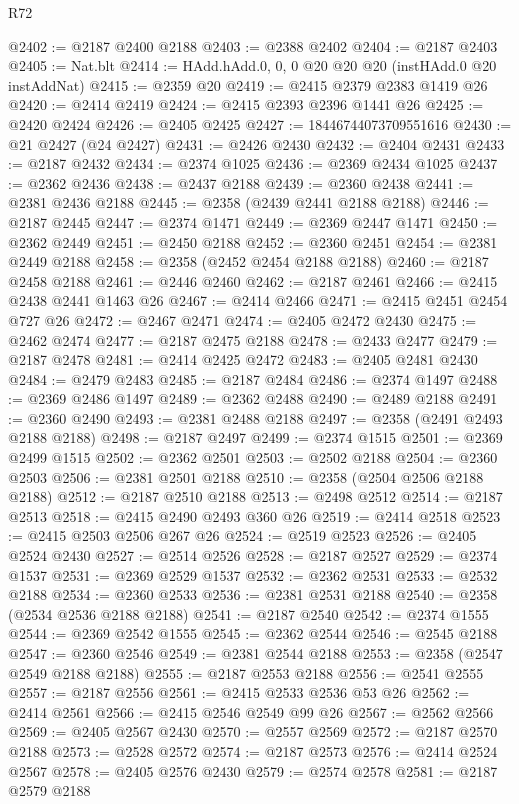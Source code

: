 \begin{lexlean}{R72}
\begin{coremodule}
@2402 := @2187 @2400 @2188
@2403 := @2388 @2402
@2404 := @2187 @2403
@2405 := Nat.blt
@2414 := HAdd.hAdd.{0, 0, 0} @20 @20 @20 (instHAdd.{0} @20 instAddNat)
@2415 := @2359 @20
@2419 := @2415 @2379 @2383 @1419 @26
@2420 := @2414 @2419
@2424 := @2415 @2393 @2396 @1441 @26
@2425 := @2420 @2424
@2426 := @2405 @2425
@2427 := 18446744073709551616
@2430 := @21 @2427 (@24 @2427)
@2431 := @2426 @2430
@2432 := @2404 @2431
@2433 := @2187 @2432
@2434 := @2374 @1025
@2436 := @2369 @2434 @1025
@2437 := @2362 @2436
@2438 := @2437 @2188
@2439 := @2360 @2438
@2441 := @2381 @2436 @2188
@2445 := @2358 (@2439 @2441 @2188 @2188)
@2446 := @2187 @2445
@2447 := @2374 @1471
@2449 := @2369 @2447 @1471
@2450 := @2362 @2449
@2451 := @2450 @2188
@2452 := @2360 @2451
@2454 := @2381 @2449 @2188
@2458 := @2358 (@2452 @2454 @2188 @2188)
@2460 := @2187 @2458 @2188
@2461 := @2446 @2460
@2462 := @2187 @2461
@2466 := @2415 @2438 @2441 @1463 @26
@2467 := @2414 @2466
@2471 := @2415 @2451 @2454 @727 @26
@2472 := @2467 @2471
@2474 := @2405 @2472 @2430
@2475 := @2462 @2474
@2477 := @2187 @2475 @2188
@2478 := @2433 @2477
@2479 := @2187 @2478
@2481 := @2414 @2425 @2472
@2483 := @2405 @2481 @2430
@2484 := @2479 @2483
@2485 := @2187 @2484
@2486 := @2374 @1497
@2488 := @2369 @2486 @1497
@2489 := @2362 @2488
@2490 := @2489 @2188
@2491 := @2360 @2490
@2493 := @2381 @2488 @2188
@2497 := @2358 (@2491 @2493 @2188 @2188)
@2498 := @2187 @2497
@2499 := @2374 @1515
@2501 := @2369 @2499 @1515
@2502 := @2362 @2501
@2503 := @2502 @2188
@2504 := @2360 @2503
@2506 := @2381 @2501 @2188
@2510 := @2358 (@2504 @2506 @2188 @2188)
@2512 := @2187 @2510 @2188
@2513 := @2498 @2512
@2514 := @2187 @2513
@2518 := @2415 @2490 @2493 @360 @26
@2519 := @2414 @2518
@2523 := @2415 @2503 @2506 @267 @26
@2524 := @2519 @2523
@2526 := @2405 @2524 @2430
@2527 := @2514 @2526
@2528 := @2187 @2527
@2529 := @2374 @1537
@2531 := @2369 @2529 @1537
@2532 := @2362 @2531
@2533 := @2532 @2188
@2534 := @2360 @2533
@2536 := @2381 @2531 @2188
@2540 := @2358 (@2534 @2536 @2188 @2188)
@2541 := @2187 @2540
@2542 := @2374 @1555
@2544 := @2369 @2542 @1555
@2545 := @2362 @2544
@2546 := @2545 @2188
@2547 := @2360 @2546
@2549 := @2381 @2544 @2188
@2553 := @2358 (@2547 @2549 @2188 @2188)
@2555 := @2187 @2553 @2188
@2556 := @2541 @2555
@2557 := @2187 @2556
@2561 := @2415 @2533 @2536 @53 @26
@2562 := @2414 @2561
@2566 := @2415 @2546 @2549 @99 @26
@2567 := @2562 @2566
@2569 := @2405 @2567 @2430
@2570 := @2557 @2569
@2572 := @2187 @2570 @2188
@2573 := @2528 @2572
@2574 := @2187 @2573
@2576 := @2414 @2524 @2567
@2578 := @2405 @2576 @2430
@2579 := @2574 @2578
@2581 := @2187 @2579 @2188

\end{coremodule}
\end{lexlean}
